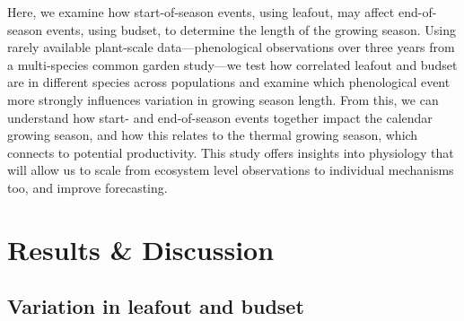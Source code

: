 \documentclass{article}[12pt]
\begin{document}
Here, we examine how start-of-season events, using leafout, may affect end-of-season events, using budset, to determine the length of the growing season.
Using rarely available plant-scale data---phenological observations over three years from a multi-species common garden study---we test how correlated leafout and budset are in different species across populations and examine which phenological event more strongly influences variation in growing season length. From this, we can understand how start- and end-of-season events together impact the calendar growing season, and how this relates to the thermal growing season, which connects to potential productivity. This study offers insights into physiology that will allow us to scale from ecosystem level observations to individual mechanisms too, and improve forecasting. %

\section{Results \& Discussion} 
\subsection{Variation in leafout and budset}
\end{document}
